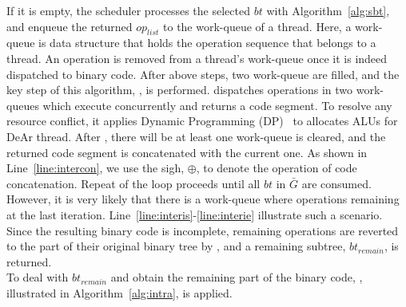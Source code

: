 If it is empty, the scheduler processes the selected $bt$ with Algorithm~\ref{alg:sbt}, 
and enqueue the returned $op_{list}$ to the work-queue of a thread.
Here, a work-queue is data structure that holds the operation sequence that belongs to a thread.
An operation is removed from a thread's work-queue once it is indeed dispatched to binary code.
After above steps, two work-queue are filled, and the key step of this algorithm, , is performed.
 dispatches operations in two work-queues which execute concurrently and returns a code segment.
To resolve any resource conflict, it applies Dynamic Programming (DP)~\cite{dp} to allocates ALUs for DeAr thread.
After , there will be at least one work-queue is cleared, 
and the returned code segment is concatenated with the current one.
As shown in Line~\ref{line:intercon}, we use the sigh, $\oplus$, to denote the operation of code concatenation.
Repeat of the loop proceeds until all $bt$ in $\bar{G}$ are consumed.
However, it is very likely that there is a work-queue where operations remaining at the last iteration.
Line~\ref{line:interis}-\ref{line:interie} illustrate such a scenario.
Since the resulting binary code is incomplete, 
remaining operations are reverted to the part of their original binary tree by ,
and a remaining subtree, $bt_{remain}$, is returned.
\\\indent 
To deal with $bt_{remain}$ and obtain the remaining part of the binary code, 
, illustrated in Algorithm~\ref{alg:intra}, is applied.
